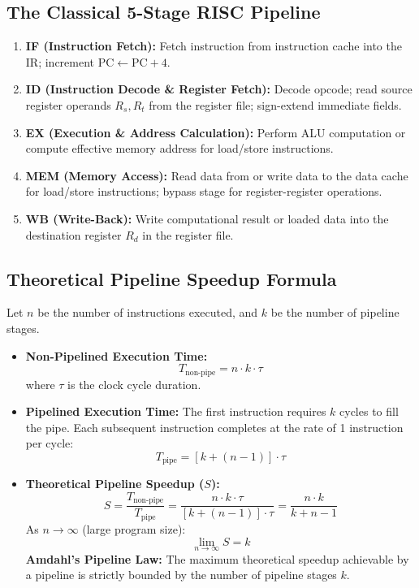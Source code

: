 \subsection{The Classical 5-Stage RISC Pipeline}
\begin{enumerate}[label=\bfseries\arabic*.]
    \item \textbf{IF (Instruction Fetch):} Fetch instruction from instruction cache into the IR; increment $\text{PC} \leftarrow \text{PC} + 4$.
    \item \textbf{ID (Instruction Decode \& Register Fetch):} Decode opcode; read source register operands $R_s, R_t$ from the register file; sign-extend immediate fields.
    \item \textbf{EX (Execution \& Address Calculation):} Perform ALU computation or compute effective memory address for load/store instructions.
    \item \textbf{MEM (Memory Access):} Read data from or write data to the data cache for load/store instructions; bypass stage for register-register operations.
    \item \textbf{WB (Write-Back):} Write computational result or loaded data into the destination register $R_d$ in the register file.
\end{enumerate}

\subsection{Theoretical Pipeline Speedup Formula}
Let $n$ be the number of instructions executed, and $k$ be the number of pipeline stages.
\begin{itemize}
    \item \textbf{Non-Pipelined Execution Time:}
    \begin{equation}
    \label{eq:non_pipelined_time}
    T_{\text{non-pipe}} = n \cdot k \cdot \tau
    \end{equation}
    where $\tau$ is the clock cycle duration.
    \item \textbf{Pipelined Execution Time:}
    The first instruction requires $k$ cycles to fill the pipe. Each subsequent instruction completes at the rate of 1 instruction per cycle:
    \begin{equation}
    \label{eq:pipelined_time}
    T_{\text{pipe}} = [k + (n - 1)] \cdot \tau
    \end{equation}
    \item \textbf{Theoretical Pipeline Speedup ($S$):}
    \begin{equation}
    \label{eq:pipeline_speedup}
    S = \frac{T_{\text{non-pipe}}}{T_{\text{pipe}}} = \frac{n \cdot k \cdot \tau}{[k + (n - 1)] \cdot \tau} = \frac{n \cdot k}{k + n - 1}
    \end{equation}
    As $n \to \infty$ (large program size):
    \begin{equation}
    \label{eq:pipeline_speedup_limit}
    \lim_{n \to \infty} S = k
    \end{equation}
    \textbf{Amdahl's Pipeline Law:} The maximum theoretical speedup achievable by a pipeline is strictly bounded by the number of pipeline stages $k$.
\end{itemize}

